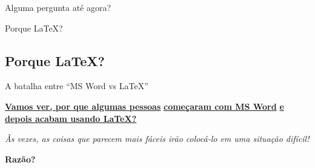 \documentclass[10pt]{beamer}
\begin{document}
\begin{frame}
\begin{center}
\Huge Alguma pergunta até agora?
\end{center}
\end{frame}


\begin{frame}
\begin{center}
\Huge Porque \LaTeX ?
\end{center}
\end{frame}

\subsection{Porque \LaTeX ?}

\begin{frame}{A batalha entre \textquotedblleft MS Word vs \LaTeX\textquotedblright}

\begin{center}
{\large \underline{\textbf{Vamos ver, por que algumas pessoas}}} {\large \underline{\textbf{começaram com MS Word}}}
{\large \underline{\textbf{e depois acabam usando \LaTeX \hspace{0.2cm}?}}}
\end{center}

\pause

\vspace{0.2cm}


\begin{center}
\textit{Às vezes, as coisas que parecem mais fáceis irão colocá-lo em uma situação difícil!}
\end{center}


\vspace{0.1cm}

\pause

\begin{center}
{\Large{\textbf{Razão?}}}
\end{center}
\end{frame}

\end{document}
